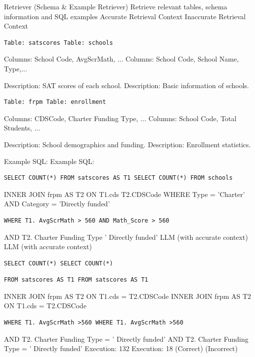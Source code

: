 \documentclass[12pt,a4paper,openright,UTF8]{ctexbook}
\begin{document}
Retriever (Schema \& Example Retriever) Retrieve relevant tables, schema information and SQL examples Accurate Retrieval Context Inaccurate Retrieval Context

\begin{lstlisting}
Table: satscores Table: schools
\end{lstlisting}

Columns: School Code, AvgScrMath, ... Columns: School Code, School Name, Type,...


Description: SAT scores of each school. Description: Basic information of schools.

\begin{lstlisting}
Table: frpm Table: enrollment
\end{lstlisting}

Columns: CDSCode, Charter Funding Type, ... Columns: School Code, Total Students, ...


Description: School demographics and funding. Description: Enrollment statistics.


Example SQL: Example SQL:

\begin{lstlisting}
SELECT COUNT(*) FROM satscores AS T1 SELECT COUNT(*) FROM schools
\end{lstlisting}

INNER JOIN frpm AS T2 ON T1.cds T2.CDSCode WHERE Type = 'Charter' AND Category = 'Directly funded'

\begin{lstlisting}
WHERE T1. AvgScrMath > 560 AND Math_Score > 560
\end{lstlisting}

AND T2. Charter Funding Type ' Directly funded' LLM (with accurate context) LLM (with accurate context)

\begin{lstlisting}
SELECT COUNT(*) SELECT COUNT(*)
\end{lstlisting}


\begin{lstlisting}
FROM satscores AS T1 FROM satscores AS T1
\end{lstlisting}

INNER JOIN frpm AS T2 ON T1.cds = T2.CDSCode INNER JOIN frpm AS T2 ON T1.cds = T2.CDSCode

\begin{lstlisting}
WHERE T1. AvgScrMath >560 WHERE T1. AvgScrMath >560
\end{lstlisting}

AND T2. Charter Funding Type = ' Directly funded' AND T2. Charter Funding Type = ' Directly funded' Execution: 132 Execution: 18 (Correct) (Incorrect)
\end{document}
